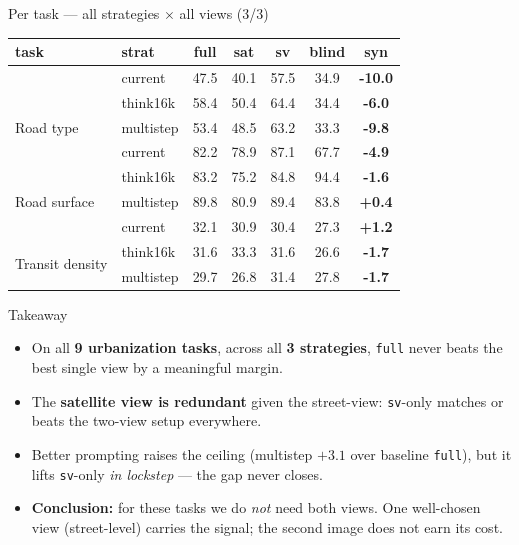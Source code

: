 \documentclass[aspectratio=169]{beamer}
\newcommand{\hl}[1]{\textbf{\textcolor{accent}{#1}}}
\begin{document}
\begin{frame}{Per task --- all strategies $\times$ all views (3/3)}
\centering\scriptsize
\begin{tabular}{llcccc>{\bfseries}c}
\toprule
task & strat & full & sat & sv & blind & syn \\
\midrule
 & current & 47.5 & 40.1 & 57.5 & 34.9 & \textcolor{bad}{-10.0} \\
\multirow{3}{*}{Road type} & think16k & 58.4 & 50.4 & 64.4 & 34.4 & \textcolor{bad}{-6.0} \\
 & multistep & 53.4 & 48.5 & 63.2 & 33.3 & \textcolor{bad}{-9.8} \\
\midrule
 & current & 82.2 & 78.9 & 87.1 & 67.7 & \textcolor{bad}{-4.9} \\
\multirow{3}{*}{Road surface} & think16k & 83.2 & 75.2 & 84.8 & 94.4 & \textcolor{bad}{-1.6} \\
 & multistep & 89.8 & 80.9 & 89.4 & 83.8 & +0.4 \\
\midrule
 & current & 32.1 & 30.9 & 30.4 & 27.3 & +1.2 \\
\multirow{3}{*}{Transit density} & think16k & 31.6 & 33.3 & 31.6 & 26.6 & \textcolor{bad}{-1.7} \\
 & multistep & 29.7 & 26.8 & 31.4 & 27.8 & \textcolor{bad}{-1.7} \\
\bottomrule
\end{tabular}
\end{frame}
\begin{frame}{Takeaway}
\begin{itemize}
  \item On all \hl{9 urbanization tasks}, across all \hl{3 strategies}, \texttt{full}
        never beats the best single view by a meaningful margin.
  \item The \hl{satellite view is redundant} given the street-view: \texttt{sv}-only
        matches or beats the two-view setup everywhere.
  \item Better prompting raises the ceiling (multistep $+3.1$ over baseline \texttt{full}),
        but it lifts \texttt{sv}-only \emph{in lockstep} --- the gap never closes.
  \item \hl{Conclusion:} for these tasks we do \emph{not} need both views. One well-chosen
        view (street-level) carries the signal; the second image does not earn its cost.
\end{itemize}
\end{frame}
\end{document}
